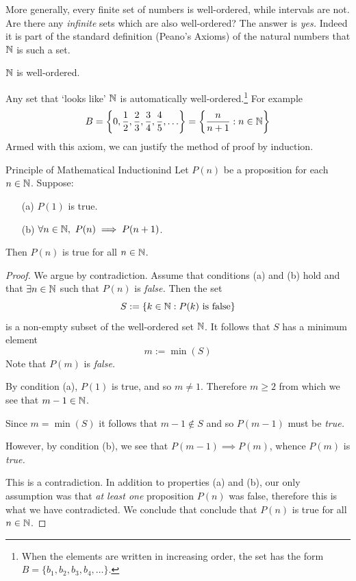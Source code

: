 More generally, every finite set of numbers is well-ordered, while intervals are not. Are there any \emph{infinite} sets which are also well-ordered? The answer is \emph{yes.} Indeed it is part of the standard definition (Peano's Axioms) of the natural numbers that $\mathbb{N}$ is such a set.

\begin{axiom}{}{}
	$\mathbb{N}$ is well-ordered.
\end{axiom}

Any set that `looks like' $\mathbb{N}$ is automatically well-ordered.\footnote{When the elements are written in increasing order, the set has the form $B=\{b_1,b_2,b_3,b_4,\ldots\}$.} For example
\[
	B=\left\{0,\frac 12,\frac 23,\frac 34,\frac 45,\ldots\right\}=\left\{\frac n{n+1}:n\in\mathbb{N}\right\}
\]
Armed with this axiom, we can justify the method of proof by induction. 

\begin{thm}{Principle of Mathematical Induction}{ind}
	Let $P(n)$ be a proposition for each $n\in\mathbb{N}$. Suppose:
	\begin{enumerate}
	  \item[(a)] $P(1)$ is true.
	  \item[(b)] $\forall n\in\mathbb{N},\ P(n)\implies P(n+1)$.
	\end{enumerate}
	Then $P(n)$ is true for all $n\in\mathbb{N}$.
\end{thm}

\begin{proof}
	We argue by contradiction. Assume that conditions (a) and (b) hold and that $\exists n\in\mathbb{N}$ such that $P(n)$ is \emph{false.} Then the set
	\[
		S:=\{k\in\mathbb{N}:P(k)\text{ is false}\}
		\]
	is a non-empty subset of the well-ordered set $\mathbb{N}$. It follows that $S$ has a minimum element
	\[
		m:=\min(S)
	\]
	Note that $P(m)$ is \emph{false.}\par
	By condition (a), $P(1)$ is true, and so $m\neq 1$. Therefore $m\ge 2$ from which we see that $m-1\in\mathbb{N}$.\par
	Since $m=\min(S)$ it follows that $m-1\not\in S$ and so $P(m-1)$ must be \emph{true.}\par
	However, by condition (b), we see that $P(m-1)\implies P(m)$, whence $P(m)$ is \emph{true.}\par
	This is a contradiction. In addition to properties (a) and (b), our only assumption was that \emph{at least one} proposition $P(n)$ was false, therefore this is what we have contradicted. We conclude that conclude that $P(n)$ is true for all $n\in\mathbb{N}$.
\end{proof}


